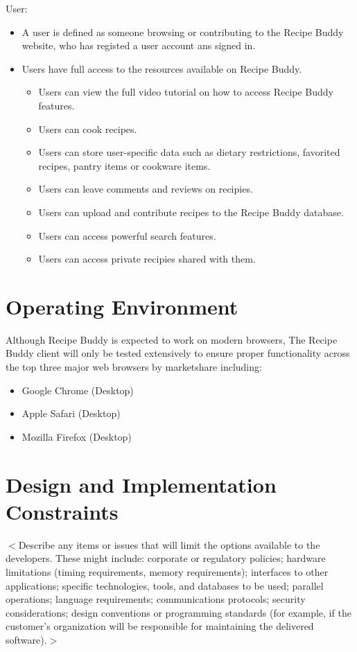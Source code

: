 \documentclass{scrreprt}
\begin{document}
User:
\begin{itemize}
    \item A user is defined as someone browsing or contributing to the Recipe Buddy website, who has registed a user account ans signed in.
    \item Users have full access to the resources available on Recipe Buddy.
    \begin{itemize}
        \item Users can view the full video tutorial on how to access Recipe Buddy features.
        \item Users can cook recipes.
        \item Users can store user-specific data such as dietary restrictions, favorited recipes, pantry items or cookware items.
        \item Users can leave comments and reviews on recipies.
        \item Users can upload and contribute recipes to the Recipe Buddy database.
        \item Users can access powerful search features.
        \item Users can access private recipies shared with them.
    \end{itemize}
\end{itemize}

\section{Operating Environment}
Although Recipe Buddy is expected to work on modern browsers, The Recipe Buddy client will only be tested extensively to ensure proper functionality across the top three major web browsers by marketshare including:
\begin{itemize}
    \item Google Chrome (Desktop)
    \item Apple Safari (Desktop)
    \item Mozilla Firefox (Desktop)
\end{itemize}

\section{Design and Implementation Constraints}
$<$Describe any items or issues that will limit the options available to the 
developers. These might include: corporate or regulatory policies; hardware 
limitations (timing requirements, memory requirements); interfaces to other 
applications; specific technologies, tools, and databases to be used; parallel 
operations; language requirements; communications protocols; security 
considerations; design conventions or programming standards (for example, if the 
customer’s organization will be responsible for maintaining the delivered 
software).$>$
\end{document}
